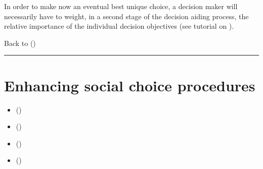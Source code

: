 \documentclass[a4paper,12pt,english]{sphinxhowto}
\begin{document}
\sphinxAtStartPar
In order to make now an eventual best unique choice, a decision maker will necessarily have to weight, in a second stage of the decision aiding process, the relative importance of the individual decision objectives (see tutorial on ).

\sphinxAtStartPar
Back to {\hyperref[\detokenize{pearls:pearls-label}]{}} ()


\bigskip\hrule\bigskip



\section{Enhancing social choice procedures}
\label{\detokenize{pearls:enhancing-social-choice-procedures}}\label{\detokenize{pearls:enhancing-social-choice-label}}
\begin{sphinxcontents}
\begin{itemize}
\item {} 
\sphinxAtStartPar
{}\label{\detokenize{pearls:id118}}{\hyperref[\detokenize{pearls:condorcet-s-critical-perspective-on-the-simple-plurality-voting-rule}]{}} ()

\item {} 
\sphinxAtStartPar
{}\label{\detokenize{pearls:id119}}{\hyperref[\detokenize{pearls:two-stage-elections-with-multipartisan-primary-selection}]{}} ()

\item {} 
\sphinxAtStartPar
{}\label{\detokenize{pearls:id120}}{\hyperref[\detokenize{pearls:tempering-plurality-tyranny-effects-with-bipolar-approval-voting}]{}} ()

\item {} 
\sphinxAtStartPar
{}\label{\detokenize{pearls:id121}}{\hyperref[\detokenize{pearls:selecting-the-winner-of-a-primary-election-a-critical-commentary}]{}} ()

\end{itemize}
\end{sphinxcontents}
\end{document}
